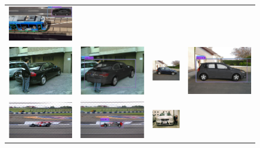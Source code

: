 \documentclass[10pt,twocolumn,letterpaper]{article}
\begin{document}
\begin{figure}[h]
\begin{tabular}{|cc|cc|}
  \includegraphics[width=0.24\linewidth]{supp/pas_car5b.png}  \\
  \includegraphics[width=0.24\linewidth]{supp/pas_car6a.png} &
  \includegraphics[width=0.24\linewidth]{supp/pas_car6b.png} & 
  \includegraphics[width=0.24\linewidth]{supp/pas_car7a.png} &
  \includegraphics[width=0.24\linewidth]{supp/pas_car7b.png}  \\
  \includegraphics[width=0.24\linewidth]{supp/pas_car10a.png} &
  \includegraphics[width=0.24\linewidth]{supp/pas_car10b.png} & 
  \includegraphics[width=0.24\linewidth]{supp/pas_car16a.png} &

\end{tabular}
\end{figure}
\end{document}
